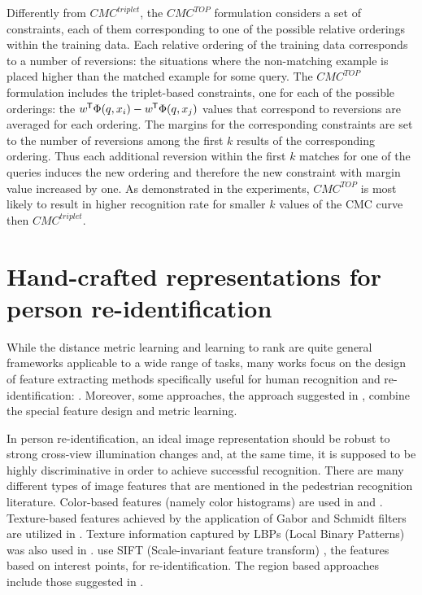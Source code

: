 Differently from $CMC^{triplet}$, the $CMC^{TOP}$ formulation considers a set of constraints, each of them corresponding to one of the possible relative orderings within the training data.
Each relative ordering of the training data corresponds to a number of reversions:  the situations where the non-matching example is placed higher than the matched example for some query. 
The $CMC^{TOP}$ formulation includes the triplet-based constraints, one for each of the possible orderings: the $w^{\mkern-1.5mu\mathsf{T}} \Phi(q, x_i) - w^{\mkern-1.5mu\mathsf{T}} \Phi(q, x_j)$ values that correspond to reversions are averaged for each ordering. The margins for the corresponding constraints are set to the number of reversions among the first $k$ results of the corresponding ordering. Thus each additional reversion within the first $k$ matches for one of the queries induces the new ordering and therefore the new constraint with margin value increased by one.  As demonstrated in the experiments,  $CMC^{TOP}$ is most likely to result in higher recognition rate for smaller $k$ values of the CMC curve then $CMC^{triplet}$.




\section{Hand-crafted representations for person re-identification} %
\label{sec:reid_features}

While the distance metric learning and learning to rank are quite general frameworks applicable to a wide range of tasks, many works focus on the design of feature extracting methods specifically useful for human recognition and re-identification: \citep{liao2015person,DBLP:journals/cviu/BazzaniCM13,ma2012bicov, ma2012local}. Moreover, some approaches, \eg{}  the approach suggested in \citep{liao2015person}, combine the special feature design and metric learning.

In person re-identification, an ideal image representation should be robust to strong cross-view illumination changes and, at the same time, it is supposed to be highly discriminative in order to achieve  successful recognition.
There are many different types of image features that are mentioned in the pedestrian recognition literature. Color-based features (namely color histograms) are used in \citep{liao2015person} and \citep{DBLP:journals/cviu/BazzaniCM13}. Texture-based features achieved by the application of Gabor \citep{fogel1989gabor} and Schmidt \citep{schmid2001constructing} filters are utilized in \citep{gray2008viewpoint}. Texture information captured by LBPs (Local Binary Patterns) \citep{ojala2002multiresolution} was also used in \citep{koestinger2012large}. \citep{jungling2011person} use SIFT (Scale-invariant feature transform) \citep{lowe2004distinctive}, \ie{} the features based on interest points, for re-identification. The region based approaches include those suggested in \citep{tuzel2008pedestrian,DBLP:journals/cviu/BazzaniCM13}. 

